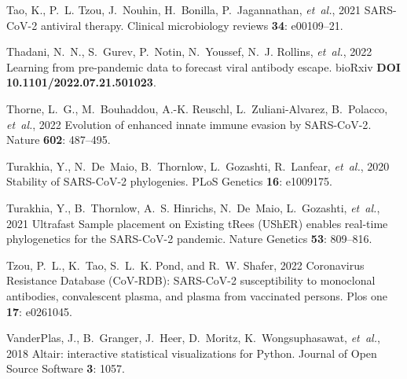 \documentclass[9pt,twocolumn,twoside]{gsajnl_modified}
\begin{document}
{\begin{thebibliography}{76}
{Tao, K., P.~L. Tzou, J.~Nouhin, H.~Bonilla, P.~Jagannathan, {\em et~al.\/}},
  2021 {SARS-CoV-2} antiviral therapy. Clinical microbiology reviews {\bf 34}:
  e00109--21.

{Thadani, N.~N., S.~Gurev, P.~Notin, N.~Youssef, N.~J. Rollins, {\em
  et~al.\/}}, 2022 Learning from pre-pandemic data to forecast viral antibody
  escape. bioRxiv {\bf DOI 10.1101/2022.07.21.501023}.

{Thorne, L.~G., M.~Bouhaddou, A.-K. Reuschl, L.~Zuliani-Alvarez, B.~Polacco,
  {\em et~al.\/}}, 2022 Evolution of enhanced innate immune evasion by
  {SARS-CoV-2}. Nature {\bf 602}: 487--495.

{Turakhia, Y., N.~De~Maio, B.~Thornlow, L.~Gozashti, R.~Lanfear, {\em
  et~al.\/}}, 2020 Stability of {SARS-CoV-2} phylogenies. PLoS Genetics {\bf
  16}: e1009175.

{Turakhia, Y., B.~Thornlow, A.~S. Hinrichs, N.~De~Maio, L.~Gozashti, {\em
  et~al.\/}}, 2021 {Ultrafast Sample placement on Existing tRees (UShER)
  enables real-time phylogenetics for the SARS-CoV-2 pandemic}. Nature Genetics
  {\bf 53}: 809--816.

{Tzou, P.~L., K.~Tao, S.~L.~K. Pond, {\rm and} R.~W. Shafer}, 2022 {Coronavirus
  Resistance Database (CoV-RDB): SARS-CoV-2 susceptibility to monoclonal
  antibodies, convalescent plasma, and plasma from vaccinated persons}. Plos
  one {\bf 17}: e0261045.

{VanderPlas, J., B.~Granger, J.~Heer, D.~Moritz, K.~Wongsuphasawat, {\em
  et~al.\/}}, 2018 Altair: interactive statistical visualizations for {Python}.
  Journal of Open Source Software {\bf 3}: 1057.


\end{thebibliography}}
\end{document}
